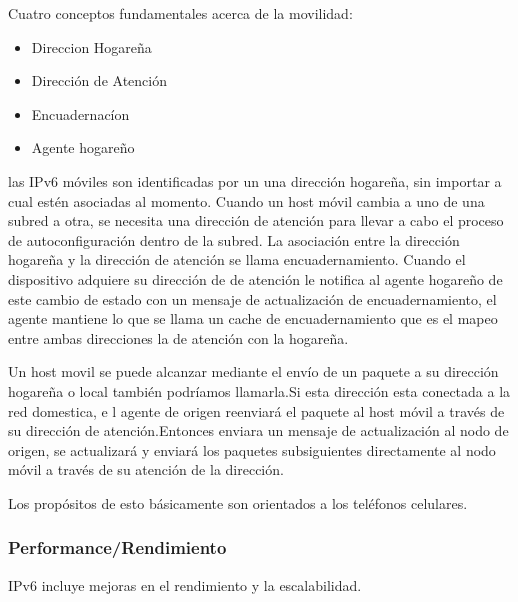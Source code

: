 \documentclass[11pt,a4paper]{article}
\begin{document}
Cuatro conceptos fundamentales acerca de la movilidad:
\begin{itemize}
\item Direccion Hogareña
\item Dirección de Atención
\item Encuadernacíon
\item Agente hogareño

\end {itemize}
las IPv6 móviles son identificadas por un una dirección hogareña, sin importar a cual estén 
asociadas al momento. Cuando un host móvil cambia a uno de una subred a otra, se necesita una 
dirección de atención para llevar a cabo el proceso de autoconfiguración dentro de la subred. La 
asociación entre la dirección hogareña y la dirección de atención se llama encuadernamiento. Cuando 
el dispositivo adquiere su dirección de de atención le notifica al agente hogareño de este cambio de 
estado con un mensaje de  actualización de encuadernamiento, el agente mantiene lo que se llama un 
cache de encuadernamiento que es el mapeo entre ambas direcciones la de atención con la hogareña.
\par Un host movil se puede alcanzar mediante el envío de un paquete a su dirección hogareña o local 
también podríamos llamarla.Si esta dirección esta conectada a la red domestica, e l agente de origen 
reenviará el paquete al host móvil a través de su dirección de atención.Entonces enviara un mensaje 
de actualización al nodo de origen, se actualizará y enviará los paquetes subsiguientes directamente 
al nodo móvil a través de su atención  de la dirección. \par 
Los propósitos de esto básicamente son orientados a los teléfonos celulares.


\subsubsection{Performance/Rendimiento}
IPv6 incluye mejoras en el rendimiento y la escalabilidad.
\end{document}
